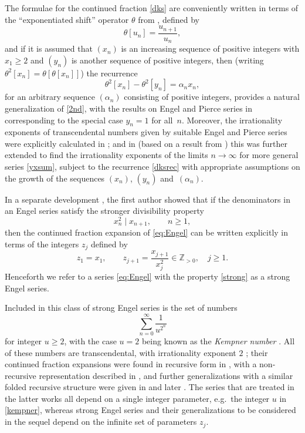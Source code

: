 \documentclass[12pt,a4paper]{amsart}
\theoremstyle{definition}
\numberwithin{equation}{section}
\newcommand\al{{\alpha}}
\newcommand{\Zp}{\mathbb{Z}_{>0}}
\begin{document}
The formulae for the continued fraction \eqref{dks} are conveniently 
written in terms of the ``exponentiated shift'' operator $\theta$ from \cite{DKS1}, defined by 
\begin{equation}
\label{eshift} 
\theta [u_n] = \frac{u_{n+1}}{u_n}, 
\end{equation} 
and if it is assumed that $(x_n)$ is an increasing sequence of positive integers with
$x_1\geq 2$ and $(y_n)$ is another sequence of positive integers, then  
(writing $\theta^2 [x_n] = \theta[\theta [ x_n]]$) 
the recurrence 
\begin{equation}
\label{dksrec} 
\theta^2 [x_n]-\theta^2[y_n] = \alpha_{n} x_n, 
\end{equation} 
for an arbitrary sequence $(\alpha_n)$ %
consisting of positive integers, provides a natural 
generalization of \eqref{2nd}, with the results on Engel and Pierce series in \cite{Hone1, Hone3, Var} 
corresponding to the special case $y_n=1$ for all~$n$. Moreover, the irrationality exponents of transcendental 
numbers given by suitable Engel and Pierce series were explicitly calculated in \cite{HoneVar}; and 
in \cite{DKS2} (based on a result from \cite{DS}) 
this was further extended to find the irrationality exponents of the limits 
$n\to\infty$ for more general series \eqref{yxsum}, subject to the recurrence 
\eqref{dksrec} with appropriate assumptions on the growth of the sequences 
$(x_n)$, $(y_n)$ and~$(\al_n)$. 
 
In a separate development \cite{Hone2}, the first author showed that if the denominators 
in an Engel series satisfy the stronger divisibility property 
\begin{equation}
\label{strong} 
x_n^2 \mid x_{n+1}, \qquad n\geq 1, 
\end{equation} 
then the continued fraction expansion of \eqref{eq:Engel} 
can be written explicitly in terms of 
the integers $z_j$ defined by 
\begin{equation}
\label{zdef}
z_1=x_1, \qquad z_{j+1} = \frac{x_{j+1}}{x_j^2} \in \Zp, \quad j\geq 1. 
\end{equation} 
Henceforth we refer to a series \eqref{eq:Engel} with the property \eqref{strong} 
as a strong Engel series. 

Included in this class of strong Engel series is the set of numbers 
\begin{equation}
\label{kempner} 
\sum_{n=0}^\infty \frac{1}{u^{2^n}} 
\end{equation} 
for integer $u\geq 2$, with the case $u=2$ being known as the \textit{Kempner number} \cite{adamc}. All of these numbers 
are transcendental, with irrationality exponent $2$ \cite{bugeaudetal}; 
their 
continued fraction expansions were found in 
recursive form in \cite{shallit1}, with a non-recursive representation 
described in \cite{shallit2}, and further generalizations with a 
similar folded recursive structure were given in \cite{shallit3} and later \cite{folded}. The series that are treated 
in the latter works all depend on a single integer parameter, e.g.\ the integer $u$ in \eqref{kempner}, 
whereas strong Engel series and their generalizations to be considered in the sequel depend 
on the infinite set of parameters $z_j$. 
\end{document}
